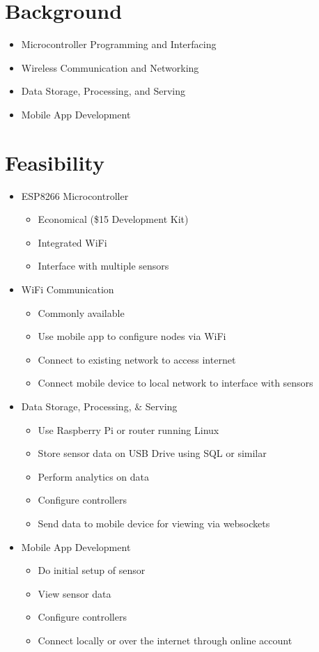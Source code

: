 	\section{Background}
		\begin{itemize}
			\item Microcontroller Programming and Interfacing
			\item Wireless Communication and Networking
			\item Data Storage, Processing, and Serving
			\item Mobile App Development
		\end{itemize}
 
	 \section{Feasibility}
		 \begin{itemize}
		 	\item ESP8266 Microcontroller
			 	\begin{itemize}
			 		\item Economical (\$15 Development Kit)
			 		\item Integrated WiFi
			 		\item Interface with multiple sensors
			 	\end{itemize}
		 	\item WiFi Communication
			 	\begin{itemize}
			 		\item Commonly available
			 		\item Use mobile app to configure nodes via WiFi
			 		\item Connect to existing network to access internet
			 		\item Connect mobile device to local network to interface with sensors
			 	\end{itemize}
		 	\item Data Storage, Processing, \& Serving
			 	\begin{itemize}
			 		\item Use Raspberry Pi or router running Linux
			 		\item Store sensor data on USB Drive using SQL or similar
			 		\item Perform analytics on data
			 		\item Configure controllers
			 		\item Send data to mobile device for viewing via websockets
			 	\end{itemize}
			 \item Mobile App Development
				 \begin{itemize}
				 	\item Do initial setup of sensor
				 	\item View sensor data
				 	\item Configure controllers
				 	\item Connect locally or over the internet through online account
				 \end{itemize}
		 \end{itemize}
		 
